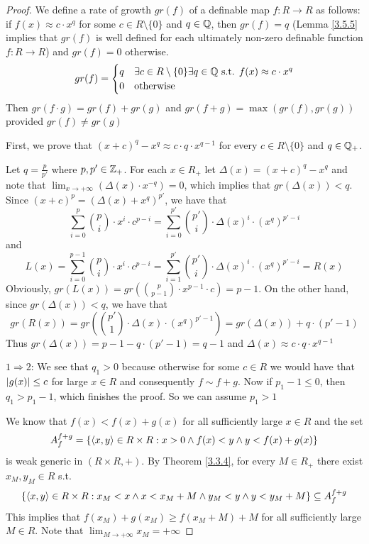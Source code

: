 \documentclass[11pt]{article}
\begin{document}
\begin{proof}
We define a rate of growth \(gr(f)\) of a definable map \(f:R\to R\) as follows:
if \(f(x)\approx c\cdot x^q\) for some \(c\in R\setminus\{0\}\) and \(q\in\mathbb{Q}\), then \(gr(f)=q\) (Lemma \ref{3.5.5} implies
that \(gr(f)\) is well defined for each ultimately non-zero definable function \(f:R\to R\))
and \(gr(f)=0\) otherwise.
\begin{equation*}
gr(f)=
\begin{cases}
q&\exists c\in R\setminus\{0\}\exists q\in\mathbb{Q}\text{ s.t. }f(x)\approx c\cdot x^q\\
0&\text{otherwise}
\end{cases}
\end{equation*}
Then \(gr(f\cdot g)=gr(f)+gr(g)\) and \(gr(f+g)=\max(gr(f),gr(g))\) provided \(gr(f)\neq gr(g)\)

First, we prove that \((x+c)^q-x^q\approx c\cdot q\cdot x^{q-1}\) for every \(c\in R\setminus\{0\}\) and \(q\in\mathbb{Q}_+\).

Let \(q=\frac{p}{p'}\) where \(p,p'\in\mathbb{Z}_+\). For each \(x\in R_+\) let \(\Delta(x)=(x+c)^q-x^q\) and note
that \(\lim_{x\to+\infty}(\Delta(x)\cdot x^{-q})=0\), which implies that \(gr(\Delta(x))<q\).
Since \((x+c)^p=(\Delta(x)+x^q)^{p'}\), we have that
\begin{equation*}
\sum_{i=0}^p\binom{p}{i}\cdot x^i\cdot c^{p-i}=\sum_{i=0}^{p'}\binom{p'}{i}\cdot\Delta(x)^i\cdot(x^q)^{p'-i}
\end{equation*}
and
\begin{equation*}
L(x)=\sum_{i=0}^{p-1}\binom{p}{i}\cdot x^i\cdot c^{p-i}=\sum_{i=1}^{p'}\binom{p'}{i}\cdot\Delta(x)^i\cdot(x^q)^{p'-i}=R(x)
\end{equation*}
Obviously, \(gr(L(x))=gr(\binom{p}{p-1}\cdot x^{p-1}\cdot c)=p-1\). On the other hand,
since \(gr(\Delta(x))<q\), we have that
\begin{equation*}
gr(R(x))=gr(\binom{p'}{1}\cdot\Delta(x)\cdot(x^q)^{p'-1})=gr(\Delta(x))+q\cdot(p'-1)
\end{equation*}
Thus \(gr(\Delta(x))=p-1-q\cdot(p'-1)=q-1\) and \(\Delta(x)\approx c\cdot q\cdot x^{q-1}\)

\(1\Rightarrow 2\): We see that \(q_1>0\) because otherwise for some \(c\in R\) we would have
that \(\abs{g(x)}\le c\) for large \(x\in R\) and consequently \(f\sim f+g\). Now if \(p_1-1\le 0\),
then \(q_1>p_1-1\), which finishes the proof. So we can assume \(p_1>1\)

We know that \(f(x)<f(x)+g(x)\) for all sufficiently large \(x\in R\) and the set
\begin{equation*}
A_f^{f+g}=\{\langle x,y\rangle\in R\times R:x> 0\wedge f(x)<y\wedge y<f(x)+g(x)\}
\end{equation*}
is weak generic in \((R\times R,+)\). By Theorem \ref{3.3.4}, for every \(M\in R_+\) there
exist \(x_M,y_M\in R\) s.t.
\begin{equation*}
\{\langle x,y\rangle\in R\times R:x_M<x\wedge x<x_M+M\wedge y_M<y\wedge y<y_M+M\}\subseteq A_f^{f+g}
\end{equation*}
This implies that \(f(x_M)+g(x_M)\ge f(x_M+M)+M\) for all sufficiently large \(M\in R\). Note
that \(\lim_{M\to+\infty}x_M=+\infty\)


\end{proof}
\end{document}
